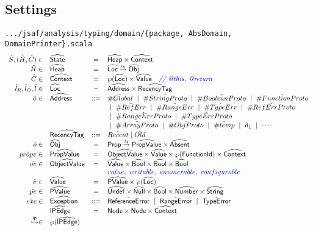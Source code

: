 \documentclass{article}
\newcommand{\SF}[1]{\mbox{\textsf{#1}}}
\newcommand{\ipnext}{\stackrel{\mathsf{ip}}{\hookrightarrow}}
\newcommand{\comment}[1]{\textit{#1}}
\newcommand{\Prop}{\SF{Prop}}
\newcommand{\abs}[1]{\widehat{\SF{#1}}}
\newcommand{\aHeap}{\abs{Heap}}
\newcommand{\aLoc}{\abs{Loc}}
\newcommand{\aObj}{\abs{Obj}}
\newcommand{\aState}{\abs{State}}
\newcommand{\aValue}{\abs{Value}}
\newcommand{\finto}{\stackrel{\tiny \SF{fin}}{\rightarrow}}
\newcommand{\powerset}[1]{\wp(#1)}
\newcommand{\fid}{\SF{FunctionId}}
\newcommand{\exc}[1]{{\sf #1}}
\newcommand{\avarloc}[1]{\hat{\##1}}
\def\inblue{\color{blue}}
\begin{document}
\subsection{Settings}
{\inblue\tt .../jsaf/analysis/typing/domain/\{package, AbsDomain, DomainPrinter\}.scala}\\
\[
\begin{array}{rlcl}
\hat{S}, (\hat{H},\hat{C}) \in & \aState & = & \aHeap \times \abs{Context}\\
\hat{H} \in & \aHeap & = & \aLoc \finto \aObj \\
\hat{C} \in & \abs{Context} & = & \powerset{\aLoc} \times \aValue \quad\comment{\inblue  // @this, @return}\\ 
\hat{l}_R,\hat{l}_O,\hat{l} \in & \aLoc &  = & \abs{Address} \times \abs{RecencyTag}\\
\hat{a} \in & \abs{Address} & ::= & \avarloc{Global} ~\mid~ 
                           \avarloc{StringProto} ~\mid~ 
                           \avarloc{BooleanProto} ~\mid~ 
                           \avarloc{FunctionProto} \\
                    & & & ~\mid~ 
                           \avarloc{RefErr} ~\mid~ 
                           \avarloc{RangeErr} ~\mid~ 
                           \avarloc{TypeErr} ~\mid~ 
                           \avarloc{RefErrProto}  \\
                    & & & ~\mid~ 
                           \avarloc{RangeErrProto} ~\mid~ 
                           \avarloc{TypeErrProto} \\
                    & & & ~\mid~ 
                           \avarloc{ArrayProto} ~\mid~ 
                           \avarloc{ObjProto} ~\mid~ 
                           \avarloc{temp} ~\mid~ 
                           \hat{a}_1 ~\mid~ \cdots \\
			& \abs{RecencyTag} & ::= & \hat{Recent} \mid \hat{Old}\\
\hat{o} \in & \aObj & = & \Prop \finto \abs{PropValue} \times \abs{Absent}\\
\hat{propv} \in & \abs{PropValue} & = & \abs{ObjectValue} \times \aValue \times \powerset{\fid} \times \abs{Context}\\
\hat{ov}\in & \abs{ObjectValue} & = & \aValue \times \abs{Bool} \times \abs{Bool} \times \abs{Bool} \\
            &                   &   & {\inblue value,\ writable,\ enumerable,\ configurable} \\
\hat{v} \in & \aValue & = & \abs{PValue} \times \powerset{\aLoc} \\
\hat{pv}\in & \abs{PValue} & = & \abs{Undef} \times \abs{Null} \times \abs{Bool} \times \abs{Number} \times \abs{String} \\
\hat{exc}\in& \abs{Exception} & ::= & \hat{\exc{ReferenceError}} ~\mid~ \hat{\exc{RangeError}} ~\mid~ \hat{\exc{TypeError}} \\
            & \abs{IPEdge} & = & \SF{Node} \times \SF{Node} \times \abs{Context} \\
\ipnext \in & \powerset{\abs{IPEdge}} & &
\end{array}
\]
\end{document}
